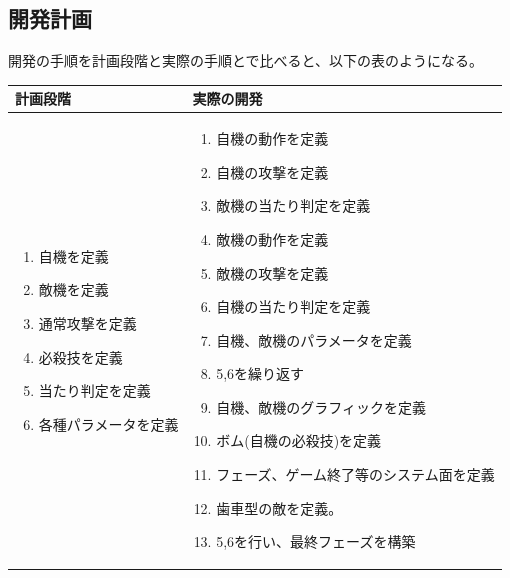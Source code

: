 \documentclass[a4paper,titlepage,11pt]{ltjsarticle}
\begin{document}
\subsection{開発計画}
開発の手順を計画段階と実際の手順とで比べると、以下の表のようになる。
\begin{table}[H]
\begin{center}
	\footnotesize
	\begin{tabular}{|p{}|p{}|} \hline
		計画段階 & 実際の開発 \\
	\hline \hline
		\begin{minipage}{48truemm}
			\begin{enumerate}
				\setlength{\leftskip}{-8truemm}
				\item 自機を定義
				\item 敵機を定義
				\item 通常攻撃を定義
				\item 必殺技を定義
				\item 当たり判定を定義
				\item 各種パラメータを定義
			\end{enumerate}
		\end{minipage}
			 &
		\begin{minipage}{48truemm} %
			\begin{enumerate}
				\setlength{\leftskip}{-7truemm}
				\item 自機の動作を定義
				\item 自機の攻撃を定義
				\item 敵機の当たり判定を定義
				\item 敵機の動作を定義
				\item 敵機の攻撃を定義
				\item 自機の当たり判定を定義
				\item 自機、敵機のパラメータを定義
				\item 5,6を繰り返す
				\item 自機、敵機のグラフィックを定義
				\item ボム(自機の必殺技)を定義
				\item フェーズ、ゲーム終了等のシステム面を定義
				\item 歯車型の敵を定義。
				\item 5,6を行い、最終フェーズを構築
			\end{enumerate}
		\end{minipage}
	\\	\hline
	\end{tabular}
\end{center}
\end{table}
\end{document}

